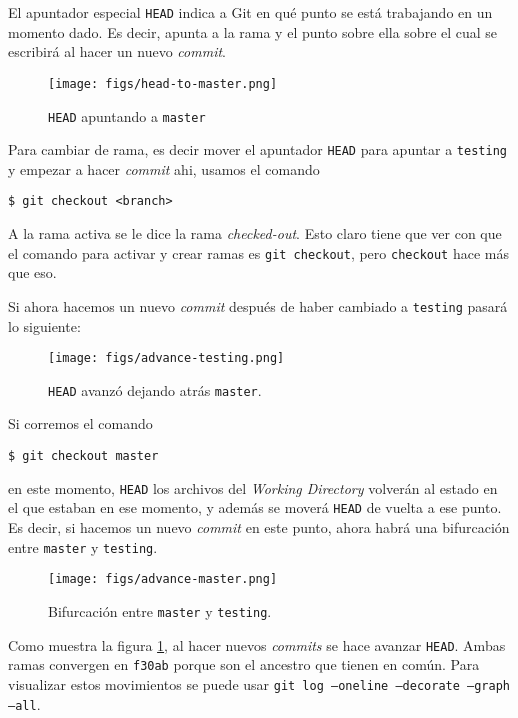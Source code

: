 \documentclass[spanish, 12pt, a4paper]{article}
\begin{document}
El apuntador especial \texttt{HEAD} indica a Git en qué punto se está trabajando
en un momento dado.
Es decir, apunta a la rama y el punto sobre ella sobre el cual se escribirá al
hacer un nuevo \textit{commit}.

\begin{figure}[h]
  \centering
  \texttt{[image: figs/head-to-master.png]}
  \caption{\texttt{HEAD} apuntando a \texttt{master}}
\end{figure}

Para cambiar de rama, es decir mover el apuntador \texttt{HEAD} para apuntar a
\texttt{testing} y empezar a hacer \textit{commit} ahi, usamos el comando
\begin{lstlisting}
$ git checkout <branch>
\end{lstlisting}

A la rama activa se le dice la rama \textit{checked-out}.
Esto claro tiene que ver con que el comando para activar y crear ramas es
\texttt{git checkout}, pero \texttt{checkout} hace más que eso.

Si ahora hacemos un nuevo \textit{commit} después de haber cambiado a
\texttt{testing} pasará lo siguiente:

\begin{figure}[h]
  \centering
  \texttt{[image: figs/advance-testing.png]}
  \caption{\texttt{HEAD} avanzó dejando atrás \texttt{master}.}
\end{figure}

Si corremos el comando
\begin{lstlisting}
$ git checkout master
\end{lstlisting}
en este momento, \texttt{HEAD} los archivos del \textit{Working Directory}
volverán al estado en el que estaban en ese momento, y además se moverá
\texttt{HEAD} de vuelta a ese punto.
Es decir, si hacemos un nuevo \textit{commit} en este punto, ahora habrá una
bifurcación entre \texttt{master} y \texttt{testing}.

\begin{figure}[h]
  \centering
  \texttt{[image: figs/advance-master.png]}
  \caption{Bifurcación entre \texttt{master} y \texttt{testing}.}
  \label{fig:bifurcacion}
\end{figure}

Como muestra la figura \ref{fig:bifurcacion}, al hacer nuevos \textit{commits}
se hace avanzar \texttt{HEAD}.
Ambas ramas convergen en \texttt{f30ab} porque son el ancestro que tienen en
común.
Para visualizar estos movimientos se puede usar \texttt{git log --oneline
--decorate --graph --all}.
\end{document}
